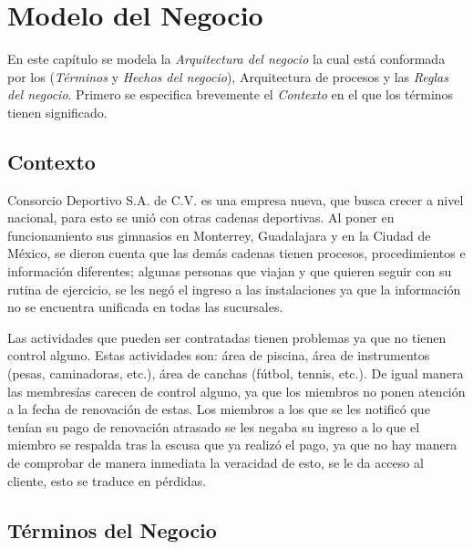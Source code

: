 \chapter{Modelo del Negocio}	
\label{cap:reqSist}

	En este capítulo se modela la {\em Arquitectura del negocio} la cual está conformada por los ({\em Términos} y {\em Hechos del negocio}), Arquitectura de procesos y las {\em Reglas del negocio}. Primero se especifica brevemente el {\em Contexto} en el que los términos tienen significado.
	
\section{Contexto}

	Consorcio Deportivo S.A. de C.V.  es una empresa nueva, que busca crecer a nivel nacional, para esto se unió con otras cadenas deportivas. Al poner en funcionamiento sus gimnasios en Monterrey, Guadalajara y en la Ciudad de México, se dieron cuenta que las demás cadenas tienen procesos, procedimientos e información diferentes; algunas personas que viajan y que quieren seguir con su rutina de ejercicio, se les negó el ingreso a las instalaciones ya que la información no se encuentra unificada en todas las sucursales.
	
	Las actividades que pueden ser contratadas tienen problemas ya que no tienen control alguno. Estas actividades son: área de piscina, área de instrumentos (pesas, caminadoras, etc.), área de canchas (fútbol, tennis, etc.).  De igual manera las membresías carecen de control alguno, ya que los miembros no ponen atención a la fecha de renovación de estas. Los miembros a los que se les notificó que tenían su pago de renovación atrasado se les negaba su ingreso a lo que el miembro se respalda tras la escusa que ya realizó el pago, ya que no hay manera de comprobar de manera inmediata la veracidad de esto, se le da acceso al cliente, esto se traduce en pérdidas.
	
\section{Términos del Negocio}
\label{sec:terminosDeNegocio}

